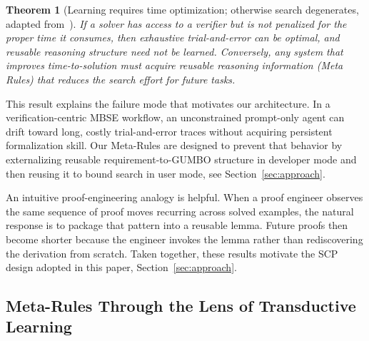 \documentclass[conference]{IEEEtran}
\newtheorem{theorem}{Theorem}
\begin{document}
\begin{theorem}[Learning requires time optimization; otherwise search degenerates, adapted from~\cite{e28030332}]
If a solver has access to a verifier but is not penalized for the proper time it consumes, then exhaustive trial-and-error can be optimal, and reusable reasoning structure need not be learned. Conversely, any system that improves time-to-solution must acquire reusable reasoning information (Meta Rules) that reduces the search effort for future tasks.
\end{theorem}

This result explains the failure mode that motivates our architecture. In a verification-centric MBSE workflow, an unconstrained prompt-only agent can drift toward long, costly trial-and-error traces without acquiring persistent formalization skill. Our Meta-Rules are designed to prevent that behavior by externalizing reusable requirement-to-GUMBO structure in developer mode and then reusing it to bound search in user mode, see  Section~\ref{sec:approach}.

An intuitive proof-engineering analogy is helpful. When a proof engineer observes the same sequence of proof moves recurring across solved examples, the natural response is to package that pattern into a reusable lemma. Future proofs then become shorter because the engineer invokes the lemma rather than rediscovering the derivation from scratch. 
Taken together, these results motivate the SCP design adopted in this paper, Section~\ref{sec:approach}. %
\subsection{Meta-Rules Through the Lens of Transductive Learning}
\label{sec:theory-bridge}
\end{document}
